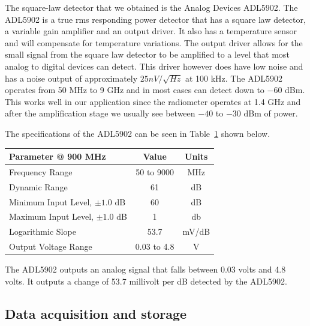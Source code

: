 The square-law detector that we obtained is the Analog Devices ADL5902.  The ADL5902 is a true rms responding power detector that has a square law detector, a variable gain amplifier and an output driver. It also has a temperature sensor and will compensate for temperature variations.  The output driver allows for the small signal from the square law detector to be amplified to a level that most analog to digital devices can detect.  This driver however does have low noise and has a noise output of approximately $25nV/ \sqrt{Hz}$ at 100 kHz.  The ADL5902 operates from 50 MHz to 9 GHz and in most cases can detect down to $-60$ dBm.  This works well in our application since the radiometer operates at 1.4 GHz and after the amplification stage we usually see between $-40$ to $-30$ dBm of power.  

The specifications of the ADL5902 can be seen in Table~\ref{ADL5902_data}
shown below.

\begin{table}[h!tb] \centering
{}
\label{ADL5902_data}
\begin{tabular}{lcc} \hline
\textbf{Parameter @ 900 MHz} & \textbf{Value} & \textbf{Units} \\ \hline
Frequency Range & 50 to 9000 & MHz \\
Dynamic Range & 61 & dB \\
Minimum Input Level, $\pm 1.0$ dB & 60 & dB \\ 
Maximum Input Level, $\pm 1.0$ dB & 1 & db \\
Logarithmic Slope & 53.7 & mV/dB \\ 
Output Voltage Range & 0.03 to 4.8 & V \\ \hline
\end{tabular}
\end{table}

The ADL5902 outputs an analog signal that falls between 0.03 volts and 4.8 volts.  It outputs a change of 53.7 millivolt per dB detected by the ADL5902.  

\subsection{Data acquisition and storage}

